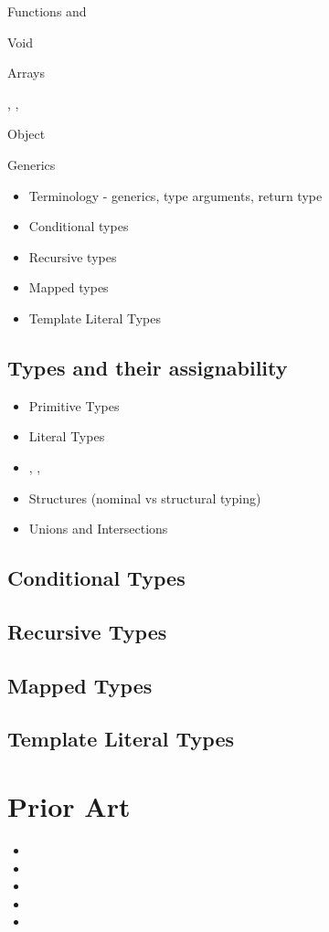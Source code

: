 Functions and 

Void

Arrays

, , 

Object

Generics

\begin{itemize}
  \item Terminology - generics, type arguments, return type
  \item Conditional types
  \item Recursive types
  \item Mapped types
  \item Template Literal Types
\end{itemize}

\subsection{Types and their assignability}

\begin{itemize}
  \item Primitive Types
  \item Literal Types
  \item {}, , 
  \item Structures (nominal vs structural typing)
  \item Unions and Intersections
\end{itemize}

\subsection{Conditional Types}
\subsection{Recursive Types}
\subsection{Mapped Types}
\subsection{Template Literal Types}

\section{Prior Art}

\begin{itemize}
  \item {}
  \item {}
  \item {}
  \item {}
  \item {}
\end{itemize}